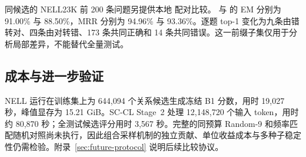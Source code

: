 同候选的 NELL23K 前 200 条问题另提供本地 \bone{} 配对比较。\scc{} 与 \bone{} 的 EM 分别为 91.00\% 与 88.50\%，MRR 分别为 94.96\% 与 93.36\%。逐题 top-1 变化为九条由错转对、四条由对转错、173 条共同正确和 14 条共同错误。这一前缀子集仅用于分析局部差异，不能替代全量测试。

\subsection{成本与进一步验证}

NELL 运行在训练集上为 644,094 个关系候选生成冻结 B1 分数，用时 19,027 秒，峰值显存为 15.21 GiB。SC-CL Stage~2 处理 12,148,720 个输入 token，用时约 80,870 秒；全测试候选评分用时 3,567 秒。完整的同预算 Random-9 和频率匹配随机对照尚未执行，因此组合采样机制的独立贡献、单位收益成本与多种子稳定性仍需检验。附录~\ref{sec:future-protocol} 说明后续比较协议。
